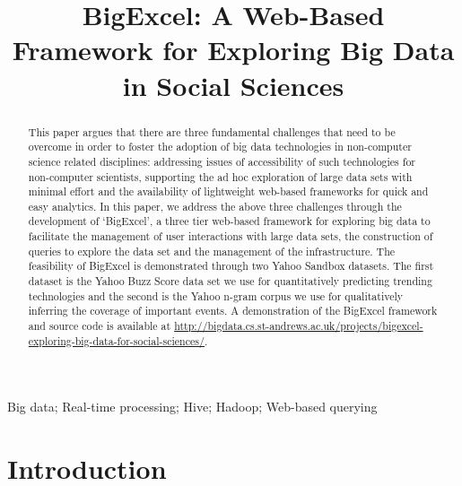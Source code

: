 \documentclass[10pt, conference, compsocconf]{IEEEtran}
\begin{document}
\title{BigExcel: A Web-Based Framework for Exploring Big Data in Social Sciences}

\author{
}

\maketitle

\begin{abstract}
This paper argues that there are three fundamental challenges that need to be overcome in order to foster the adoption of big data technologies in non-computer science related disciplines: addressing issues of accessibility of such technologies for non-computer scientists, supporting the ad hoc exploration of large data sets with minimal effort and the availability of lightweight web-based frameworks for quick and easy analytics. In this paper, we address the above three challenges through the development of `BigExcel', a three tier web-based framework for exploring big data to facilitate the management of user interactions with large data sets, the construction of queries to explore the data set and the management of the infrastructure. The feasibility of BigExcel is demonstrated through two Yahoo Sandbox datasets. The first dataset is the Yahoo Buzz Score data set we use for quantitatively predicting trending technologies and the second is the Yahoo n-gram corpus we use for qualitatively inferring the coverage of important events. A demonstration of the BigExcel framework and source code is available at \url{http://bigdata.cs.st-andrews.ac.uk/projects/bigexcel-exploring-big-data-for-social-sciences/}.  
\end{abstract}

\begin{IEEEkeywords}
Big data; Real-time processing; Hive; Hadoop; Web-based querying
\end{IEEEkeywords}

\IEEEpeerreviewmaketitle

\section{Introduction}
\label{introduction}
\end{document}
